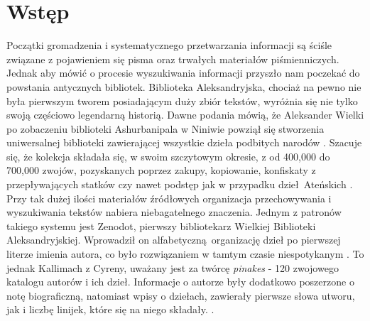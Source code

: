 \chapter*{Wstęp}
\label{chap:wstep}

Początki gromadzenia i systematycznego przetwarzania informacji są ściśle związane z pojawieniem się pisma oraz trwałych materiałów piśmienniczych. Jednak aby mówić o procesie wyszukiwania informacji przyszło nam poczekać do powstania antycznych bibliotek. Biblioteka Aleksandryjska, chociaż na pewno nie była pierwszym tworem posiadającym duży zbiór tekstów, wyróżnia się nie tylko swoją częściowo legendarną historią. Dawne podania mówią, że Aleksander Wielki po zobaczeniu biblioteki Ashurbanipala w Niniwie powziął się stworzenia uniwersalnej biblioteki zawierającej wszystkie dzieła podbitych narodów \autocite{phillips2010}. Szacuje się, że kolekcja składała się, w swoim szczytowym okresie, z od 400,000 do 700,000 zwojów, pozyskanych poprzez zakupy, kopiowanie, konfiskaty z przepływających statków czy nawet podstęp jak w przypadku dzieł Ateńskich  \autocite{phillips2010}. Przy tak dużej ilości materiałów źródłowych organizacja przechowywania i wyszukiwania tekstów nabiera niebagatelnego znaczenia. Jednym z patronów takiego systemu jest Zenodot, pierwszy bibliotekarz Wielkiej Biblioteki Aleksandryjskiej. Wprowadził on alfabetyczną organizację dzieł po pierwszej literze imienia autora, co było rozwiązaniem w tamtym czasie niespotykanym \autocite{phillips2010}. To jednak Kallimach z Cyreny, uważany jest za twórcę \textit{pinakes} - 120 zwojowego katalogu autorów i ich dzieł. Informacje o autorze były dodatkowo poszerzone o notę biograficzną, natomiast wpisy o dziełach, zawierały pierwsze słowa utworu, jak i liczbę linijek, które się na niego składały. \autocite{phillips2010}. \newline



